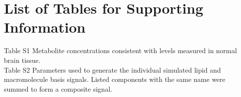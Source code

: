 \documentclass[num-refs]{wiley-article}
\begin{document}





\clearpage
\listoffigures

\section*{List of Tables for Supporting Information}
Table S1 Metabolite concentrations consistent with levels measured in normal brain tissue. \\
Table S2 Parameters used to generate the individual simulated lipid and macromolecule basis signals. Listed components with the same name were summed to form a composite signal. \\
\end{document}
